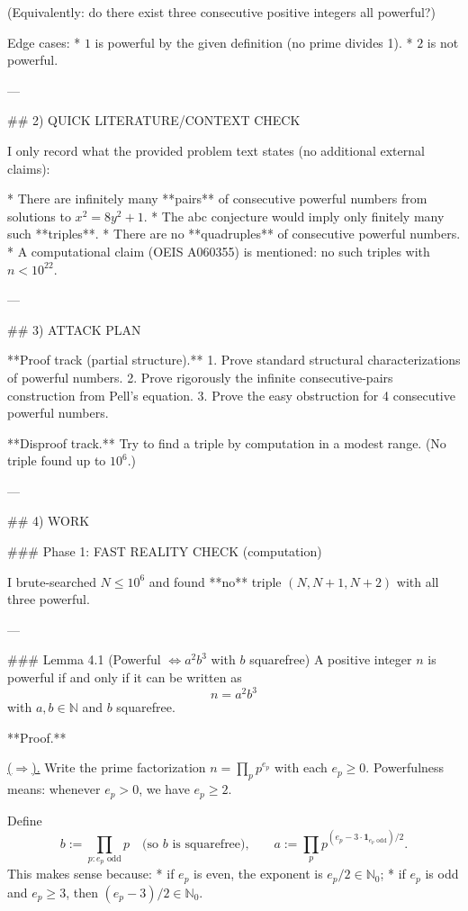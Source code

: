 (Equivalently: do there exist three consecutive positive integers all powerful?)

Edge cases:
* \(1\) is powerful by the given definition (no prime divides 1).
* \(2\) is not powerful.

---

## 2) QUICK LITERATURE/CONTEXT CHECK

I only record what the provided problem text states (no additional external claims):

* There are infinitely many **pairs** of consecutive powerful numbers from solutions to
  \(x^2=8y^2+1\).
* The abc conjecture would imply only finitely many such **triples**.
* There are no **quadruples** of consecutive powerful numbers.
* A computational claim (OEIS A060355) is mentioned: no such triples with \(n<10^{22}\).

---

## 3) ATTACK PLAN

**Proof track (partial structure).**
1. Prove standard structural characterizations of powerful numbers.
2. Prove rigorously the infinite consecutive-pairs construction from Pell’s equation.
3. Prove the easy obstruction for 4 consecutive powerful numbers.

**Disproof track.**
Try to find a triple by computation in a modest range. (No triple found up to \(10^6\).)

---

## 4) WORK

### Phase 1: FAST REALITY CHECK (computation)

I brute-searched \(N\le 10^6\) and found **no** triple \((N,N+1,N+2)\) with all three powerful.

---

### Lemma 4.1 (Powerful \(\Leftrightarrow a^2 b^3\) with \(b\) squarefree)
A positive integer \(n\) is powerful if and only if it can be written as
\[
 n=a^2 b^3
\]
with \(a,b\in\mathbb N\) and \(b\) squarefree.

**Proof.**

\underline{(\(\Rightarrow\)).}
Write the prime factorization \(n=\prod_p p^{e_p}\) with each \(e_p\ge 0\). Powerfulness means:
whenever \(e_p>0\), we have \(e_p\ge 2\).

Define
\[
 b:=\prod_{p: e_p\text{ odd}} p\quad\text{(so }b\text{ is squarefree),}\qquad
 a:=\prod_p p^{(e_p-3\cdot\mathbf 1_{e_p\text{ odd}})/2}.
\]
This makes sense because:
* if \(e_p\) is even, the exponent is \(e_p/2\in\mathbb N_0\);
* if \(e_p\) is odd and \(e_p\ge 3\), then \((e_p-3)/2\in\mathbb N_0\).

